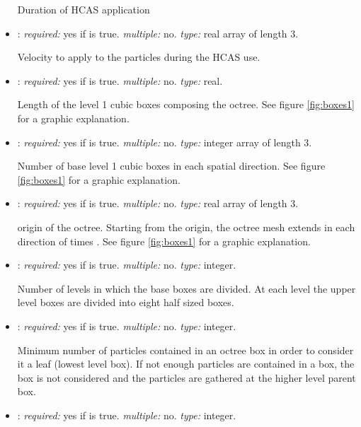 \begin{itemize}
Duration of HCAS application

\item {}: \textit{required:} yes if  is true. \textit{multiple:} no. \textit{type:} real array of length 3.

Velocity to apply to the particles during the HCAS use. 

\item {}: \textit{required:} yes if  is true. \textit{multiple:} no. \textit{type:} real.

Length of the level 1 cubic boxes composing the octree. See figure \ref{fig:boxes1} for a graphic explanation.

\item {}: \textit{required:} yes if  is true. \textit{multiple:} no. \textit{type:} integer array of length 3.

Number of base level 1 cubic boxes in each spatial direction. See figure \ref{fig:boxes1} for a graphic explanation.

\item {}: \textit{required:} yes if  is true. \textit{multiple:} no. \textit{type:} real array of length 3. 

origin of the octree. Starting from the origin, the octree mesh extends in each direction of  times . See figure \ref{fig:boxes1} for a graphic explanation.

\item {}: \textit{required:} yes if  is true. \textit{multiple:} no. \textit{type:} integer.

Number of levels in  which the base boxes are divided. At each level the upper level boxes are divided into eight half sized boxes. 

\item {}: \textit{required:} yes if  is true. \textit{multiple:} no. \textit{type:} integer.

Minimum number of particles contained in an octree box in order to consider it a leaf (lowest level box). If not enough particles are contained in a box, the box is not considered and the particles are gathered at the higher level parent box.

\item {}: \textit{required:} yes if  is true. \textit{multiple:} no. \textit{type:} integer.


\end{itemize}
